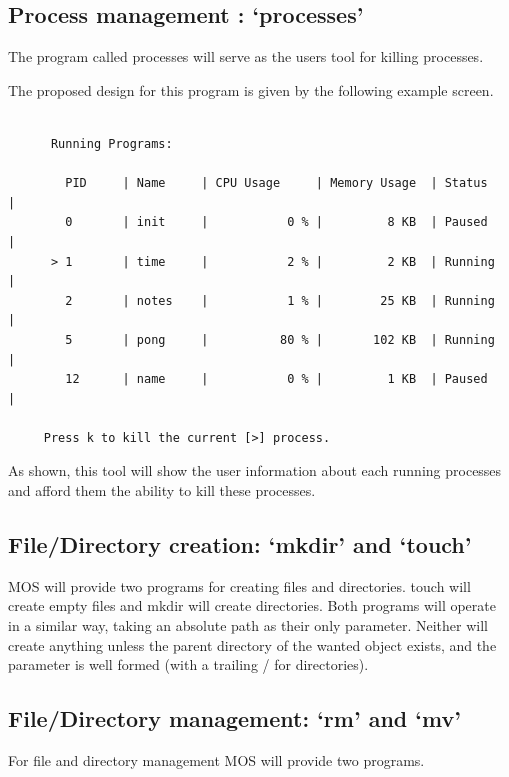 \documentclass[a4paper]{report}
\begin{document}
\subsection{Process management : `processes'}

The program called processes will serve as the users tool for killing processes.

The proposed design for this program is given by the following example screen.

{\ttfamily \small
  \begin{framed}
    \begin{verbatim}

      Running Programs:

        PID     | Name     | CPU Usage     | Memory Usage  | Status     |
        0       | init     |           0 % |         8 KB  | Paused     |
      > 1       | time     |           2 % |         2 KB  | Running    |
        2       | notes    |           1 % |        25 KB  | Running    |
        5       | pong     |          80 % |       102 KB  | Running    |
        12      | name     |           0 % |         1 KB  | Paused     |

     Press k to kill the current [>] process.

    \end{verbatim}
  \end{framed}
}

As shown, this tool will show the user information about each running processes and afford them the ability to kill these processes.

\subsection{File/Directory creation: `mkdir' and `touch'}

MOS will provide two programs for creating files and directories. touch will create empty files and mkdir will create directories. Both programs will operate in a similar way, taking an absolute path as their only parameter. Neither will create anything unless the parent directory of the wanted object exists, and the parameter is well formed (with a trailing / for directories).

\subsection{File/Directory management: `rm' and `mv'}

For file and directory management MOS will provide two programs.
\end{document}
